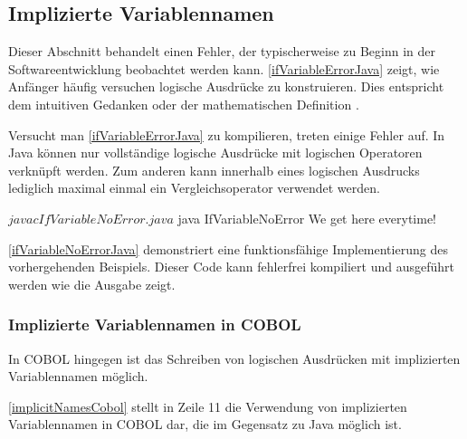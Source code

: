 \subsection{Implizierte Variablennamen}
Dieser Abschnitt behandelt einen Fehler, der typischerweise zu Beginn in der Softwareentwicklung beobachtet werden kann. \autoref{ifVariableErrorJava} zeigt, wie Anfänger häufig versuchen logische Ausdrücke zu konstruieren. Dies entspricht dem intuitiven Gedanken  oder der mathematischen Definition .

\sepCodeAndOutputCheck
\begin{shellwindow}
$ javac -Xmaxerrs 3 IfVariableError.java 
IfVariableError.java:4: error: > expected
        if (System.currentTimeMillis() > 0 && < Long.MAX_VALUE) {
                                                              ^
IfVariableError.java:4: error: ')' expected
        if (System.currentTimeMillis() > 0 && < Long.MAX_VALUE) {
                                                               ^
IfVariableError.java:8: error: illegal start of type
        if (0 < System.currentTimeMillis() < Long.MAX_VALUE) {
        ^
3 errors
\end{shellwindow}
Versucht man \autoref{ifVariableErrorJava} zu kompilieren, treten einige Fehler auf. In Java können nur vollständige logische Ausdrücke mit logischen Operatoren verknüpft werden. Zum anderen kann innerhalb eines logischen Ausdrucks lediglich maximal einmal ein Vergleichsoperator verwendet werden. 

\sepCodeAndOutputCheck
\begin{shellwindow}
$ javac IfVariableNoError.java 
$ java IfVariableNoError
We get here everytime!
\end{shellwindow}
\autoref{ifVariableNoErrorJava} demonstriert eine funktionsfähige Implementierung des vorhergehenden Beispiels. Dieser Code kann fehlerfrei kompiliert und ausgeführt werden wie die Ausgabe zeigt.

\subsubsection*{Implizierte Variablennamen in COBOL}
In COBOL hingegen ist das Schreiben von logischen Ausdrücken mit implizierten Variablennamen möglich.

\autoref{implicitNamesCobol} stellt in Zeile 11 die Verwendung von implizierten Variablennamen in COBOL dar, die im Gegensatz zu Java möglich ist.